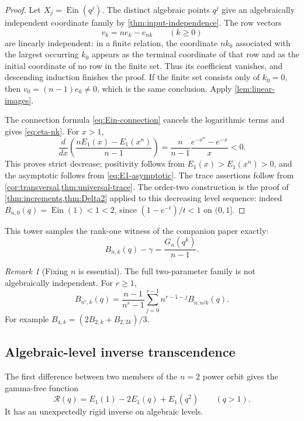 \documentclass[11pt]{article}
\theoremstyle{keio}
\theoremstyle{definition}
\theoremstyle{remark}
\newtheorem{remark}[theorem]{Remark}
\newcommand{\Ein}{\operatorname{Ein}}
\begin{document}
\begin{proof}
Let \(X_j=\Ein(q^j)\).  The distinct algebraic points \(q^j\) give an
algebraically independent coordinate family by
\cref{thm:input-independence}.  The row vectors
\[
 v_k=ne_k-e_{nk}\qquad(k\ge0)
\]
are linearly independent: in a finite relation, the coordinate \(nk_0\)
associated with the largest occurring \(k_0\) appears as the terminal
coordinate of that row and as the initial coordinate of no row in the
finite set.  Thus its coefficient vanishes, and descending induction
finishes the proof.  If the finite set consists only of \(k_0=0\), then
\(v_0=(n-1)e_0\ne0\), which is the same conclusion.  Apply
\cref{lem:linear-images}.

The connection formula \eqref{eq:Ein-connection} cancels the logarithmic
terms and gives \eqref{eq:eta-nk}.  For \(x>1\),
\[
 \frac d{dx}\left(
 \frac{nE_1(x)-E_1(x^n)}{n-1}\right)
 =\frac n{n-1}\frac{e^{-x^n}-e^{-x}}x<0.
\]
This proves strict decrease; positivity follows from
\(E_1(x)>E_1(x^n)>0\), and the asymptotic follows from
\eqref{eq:E1-asymptotic}.  The trace assertions follow from
\cref{cor:transversal,thm:universal-trace}.  The order-two construction is
the proof of \cref{thm:increments,thm:Delta2} applied to this decreasing
level sequence: indeed \(B_{n,0}(q)=\Ein(1)<1<2\), since
\((1-e^{-t})/t<1\) on \((0,1]\).
\end{proof}

This tower samples the rank-one witness of the companion paper exactly:
\begin{equation}\label{eq:B-Gn}
 B_{n,k}(q)-\gamma=\frac{G_n(q^k)}{n-1}.
\end{equation}

\begin{remark}[Fixing \(n\) is essential]
The full two-parameter family is not algebraically independent.  For
\(r\ge1\),
\begin{equation}\label{eq:cross-n-relation}
 B_{n^r,k}(q)=\frac{n-1}{n^r-1}
 \sum_{j=0}^{r-1}n^{r-1-j}B_{n,n^jk}(q).
\end{equation}
For example \(B_{4,k}=(2B_{2,k}+B_{2,2k})/3\).
\end{remark}

\subsection{Algebraic-level inverse transcendence}

The first difference between two members of the \(n=2\) power orbit gives
the gamma-free function
\begin{equation}\label{eq:scriptR-def}
 \mathscr R(q)=E_1(1)-2E_1(q)+E_1(q^2)\qquad(q>1).
\end{equation}
It has an unexpectedly rigid inverse on algebraic levels.
\end{document}
